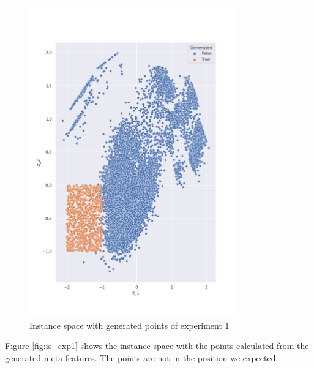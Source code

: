 \begin{figure}[H]
    \centering
    \includegraphics[width=0.8\textwidth]{Cap5/is_exp1.png}
    \caption{Instance space with generated points of experiment 1}
    \label{fig:is_gen_points1}
\end{figure}

Figure \ref{fig:is_exp1} shows the instance space with the points calculated from the generated meta-features. The points are not in the position we expected.

